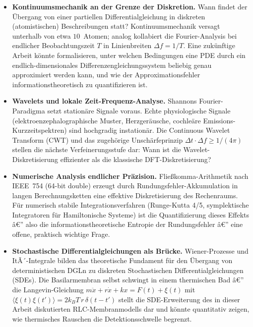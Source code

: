 ﻿\documentclass[12pt,a4paper,titlepage]{report}
\begin{document}
\begin{itemize}[leftmargin=2em]
  \item \textbf{Kontinuumsmechanik an der Grenze der Diskretion.}
    Wann findet der Übergang von einer partiellen Differentialgleichung
    in diskreten (atomistischen) Beschreibungen statt?
    Kontinuumsmechanik versagt unterhalb von etwa $10$~Atomen;
    analog kollabiert die Fourier-Analysis bei endlicher Beobachtungszeit
    $T$ in Linienbreiten $\Delta f = 1/T$.
    Eine zukünftige Arbeit könnte formalisieren, unter welchen Bedingungen
    eine PDE durch ein endlich-dimensionales Differenzengleichungssystem
    beliebig genau approximiert werden kann, und wie der Approximationsfehler
    informationstheoretisch zu quantifizieren ist.
  \item \textbf{Wavelets und lokale Zeit-Frequenz-Analyse.}
    Shannons Fourier-Paradigma setzt stationäre Signale voraus.
    Echte physiologische Signale (elektroenzephalographische Muster,
    Herzgeräusche, cochleäre Emissions-Kurzzeitspektren) sind
    hochgradig instationär.
    Die Continuous Wavelet Transform (CWT) und das zugehörige
    Unschärfeprinzip $\Delta t \cdot \Delta f \geq 1/(4\pi)$
    stellen die nächste Verfeinerungsstufe dar:
    Wann ist die Wavelet-Diskretisierung effizienter als die
    klassische DFT-Diskretisierung?
  \item \textbf{Numerische Analysis endlicher Präzision.}
    Fließkomma-Arithmetik nach IEEE~754 (64-bit double) erzeugt durch
    Rundungsfehler-Akkumulation in langen Berechnungsketten eine
    effektive Diskretisierung des Rechenraums.
    Für numerisch stabile Integrationsverfahren (Runge-Kutta 4/5,
    symplektische Integratoren für Hamiltonische Systeme) ist die
    Quantifizierung dieses Effekts â€” also die informationstheoretische
    Entropie der Rundungsfehler â€” eine offene, praktisch wichtige Frage.
  \item \textbf{Stochastische Differentialgleichungen als Brücke.}
    Wiener-Prozesse und ItÃ´-Integrale bilden das theoretische
    Fundament für den Übergang von deterministischen DGLn
    zu diskreten Stochastischen Differentialgleichungen (SDEs).
    Die Basilarmembran selbst schwingt in einem thermischen Bad â€”
    die Langevin-Gleichung
    $m\ddot{x} + r\dot{x} + kx = F(t) + \xi(t)$
    mit $\langle\xi(t)\xi(t')\rangle = 2k_BT\,r\,\delta(t-t')$
    stellt die SDE-Erweiterung des in dieser Arbeit diskutierten
    RLC-Membranmodells dar und könnte quantitativ zeigen,
    wie thermisches Rauschen die Detektionsschwelle begrenzt.
\end{itemize}
\end{document}
